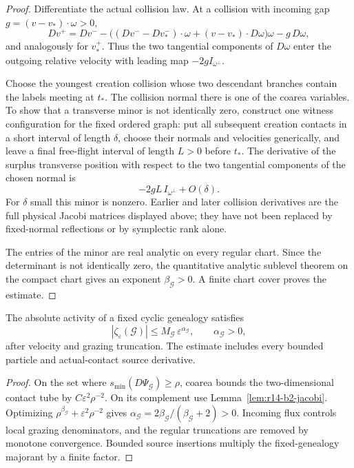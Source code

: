 \begin{proof}
Differentiate the actual collision law.  At a collision with incoming gap
\(g=(v-v_*)\cdot\omega>0\),
\[
 Dv^+
 =Dv^--\bigl((Dv^--Dv_*^-)\cdot\omega
 +(v-v_*)\cdot D\omega\bigr)\omega
 -g\,D\omega ,
\]
and analogously for \(v_*^+\).  Thus the two tangential components of
\(D\omega\) enter the outgoing relative velocity with leading map
\(-2gI_{\omega^\perp}\).

Choose the youngest creation collision whose two descendant branches contain
the labels meeting at \(t_*\).  The collision normal there is one of the
coarea variables.  To show that a transverse minor is not identically zero,
construct one witness configuration for the fixed ordered graph: put all
subsequent creation contacts in a short interval of length \(\delta\), choose
their normals and velocities generically, and leave a final free-flight
interval of length \(L>0\) before \(t_*\).  The derivative of the surplus
transverse position with respect to the two tangential components of the
chosen normal is
\[
 -2gL\,I_{\omega^\perp}+O(\delta).
\]
For \(\delta\) small this minor is nonzero.  Earlier and later collision
derivatives are the full physical Jacobi matrices displayed above; they have
not been replaced by fixed-normal reflections or by symplectic rank alone.

The entries of the minor are real analytic on every regular chart.
Since the determinant is not identically zero, the quantitative analytic
sublevel theorem on the compact chart gives an exponent
\(\beta_{\mathcal G}>0\).  A finite chart cover proves the estimate.
\end{proof}

\begin{lemma}
\label{lem:r14-b2-tube}
The absolute activity of a fixed cyclic genealogy satisfies
\[
 |\zeta_\varepsilon(\mathcal G)|
 \le M_{\mathcal G}\,
 \varepsilon^{\alpha_{\mathcal G}},
 \qquad \alpha_{\mathcal G}>0,
\]
after velocity and grazing truncation.  The estimate includes every bounded
particle and actual-contact source derivative.
\end{lemma}

\begin{proof}
On the set where
\(s_{\min}(D\Psi_{\mathcal G})\ge\rho\), coarea bounds the two-dimensional
contact tube by \(C\varepsilon^2\rho^{-2}\).  On its complement use
Lemma~\ref{lem:r14-b2-jacobi}.  Optimizing
\(\rho^{\beta_{\mathcal G}}+\varepsilon^2\rho^{-2}\) gives
\(\alpha_{\mathcal G}=2\beta_{\mathcal G}/(\beta_{\mathcal G}+2)>0\).
Incoming flux controls local grazing denominators, and the regular
truncations are removed by monotone convergence.  Bounded source insertions
multiply the fixed-genealogy majorant by a finite factor.
\end{proof}


